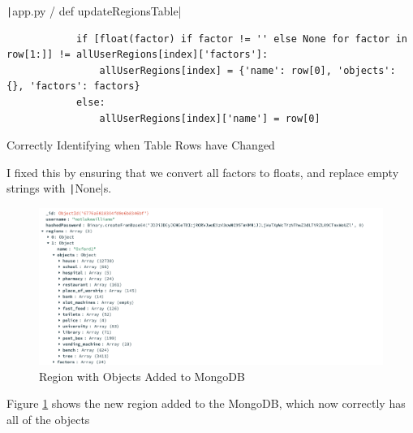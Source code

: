\documentclass[12pt]{report}
\newcommand{\pil}[1]{\protect\texttt|#1|}
\begin{document}
\begin{listing}[H]
\pil{app.py / def updateRegionsTable}
\begin{verbatim}
            if [float(factor) if factor != '' else None for factor in row[1:]] != allUserRegions[index]['factors']:
                allUserRegions[index] = {'name': row[0], 'objects': {}, 'factors': factors}
            else:
                allUserRegions[index]['name'] = row[0]
\end{verbatim}
\caption{Correctly Identifying when Table Rows have Changed}\label{cs:tableRowsChanging}
\end{listing}

I fixed this by ensuring that we convert all factors to floats, and replace empty strings with \pil{None}s.

\begin{figure}[H]
\centering
\includegraphics[width=14cm]{ss20.12.png}
\caption{Region with Objects Added to MongoDB}\label{fig:ss20.12}
\end{figure}

Figure \ref{fig:ss20.12} shows the new region added to the MongoDB, which now correctly has all of the objects

\begin{center}
\end{center}
\end{document}
